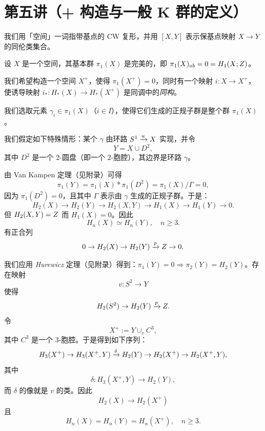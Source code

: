 \section{第五讲（+ 构造与一般 K 群的定义）}

我们用「空间」一词指带基点的 CW 复形，并用 $[X,Y]$ 表示保基点映射 $X\to Y$ 的同伦类集合。

设 $X$ 是一个空间，其基本群 $\pi_1(X)$ 是完美的，即 $\pi_1(X)_{ab}=0=H_1(X;Z)$。

 我们希望构造一个空间 $X^+$，使得 $\pi_1(X^+)=0$，同时有一个映射 $i:X\to X^+$，使诱导映射 $i_*:H_*(X)\to H_*(X^+)$ 是同调中的\emph{同构}。

 我们选取元素 $\gamma_i\in\pi_1(X)$（$i\in I$），使得它们生成的正规子群是整个群 $\pi_1(X)$。

我们假定如下特殊情形：某个 $\gamma$ 由环路 $S^1\xrightarrow{u}X$ 实现，并令
\[ Y=X\cup D^2, \]
其中 $D^2$ 是一个 2-圆盘（即一个 $2$-胞腔），其边界是环路 $\gamma$。

由 Van Kampen 定理（见附录）可得
\[ \pi_1(Y)=\pi_1(X)*\pi_1(D^2)=\pi_1(X)/\Gamma=0, \]
因为 $\pi_1(D^2)=0$，且其中 $\Gamma$ 表示由 $\gamma$ 生成的正规子群。于是：
\[ H_2(X)\to H_2(Y)\to H_2(X,Y)\to H_1(X)\to H_1(Y)\to 0. \]
但 $H_2(X,Y)=Z$ 而 $H_1(X)=0$。因此
\[ H_n(X)\simeq H_n(Y),\quad n\ge 3. \]
有正合列
\[ 0\to H_2(X)\to H_2(Y)\xrightarrow{p}Z\to 0. \]



我们应用 \emph{Hurewicz} 定理（见附录）得到：$\pi_1(Y)=0\Rightarrow\pi_2(Y)=H_2(Y)$。存在映射
\[ v:S^2\to Y \]
使得
\[ H_2(S^2)\to H_2(Y)\xrightarrow{p}Z. \]
令
\[ X^+:=Y\cup_v C^3, \]
其中 $C^3$ 是一个 $3$-胞腔。于是得到如下序列：
\[ H_3(X^+)\to H_3(X^+,Y)\xrightarrow{\delta}H_2(Y)\to H_2(X^+)\to H_2(X^+,Y), \]
其中
\[ \delta:H_3(X^+,Y)\to H_2(Y), \]
而 $\delta$ 的像就是 $v$ 的类。因此
\[ H_2(X)\to H_2(X^+) \]
且
\[ H_n(X)=H_n(Y)=H_n(X^+),\quad n\ge 3. \]

